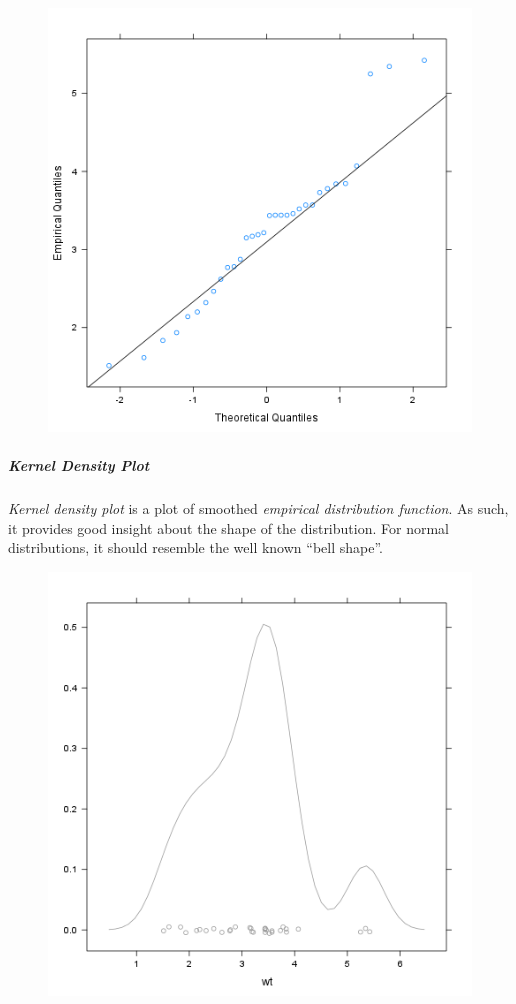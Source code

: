 \documentclass[]{article}
\makeatletter
\def\maxwidth{\ifdim\Gin@nat@width>\linewidth\linewidth
\else\Gin@nat@width\fi}
\let\Oldincludegraphics\includegraphics
\renewcommand{\includegraphics}[1]{\Oldincludegraphics[width=\maxwidth]{#1}}
\makeatother
\begin{document}
\begin{figure}[htbp]
\centering
\includegraphics{ff471a5bcb80aaf91b4c053ab038d69a.png}
\caption{}
\end{figure}

\subparagraph{Kernel Density Plot}

\emph{Kernel density plot} is a plot of smoothed \emph{empirical
distribution function}. As such, it provides good insight about the
shape of the distribution. For normal distributions, it should resemble
the well known ``bell shape''.

\begin{figure}[htbp]
\centering
\includegraphics{af2319216ad60bc78730e69af4e62023.png}
\caption{}
\end{figure}
\end{document}
